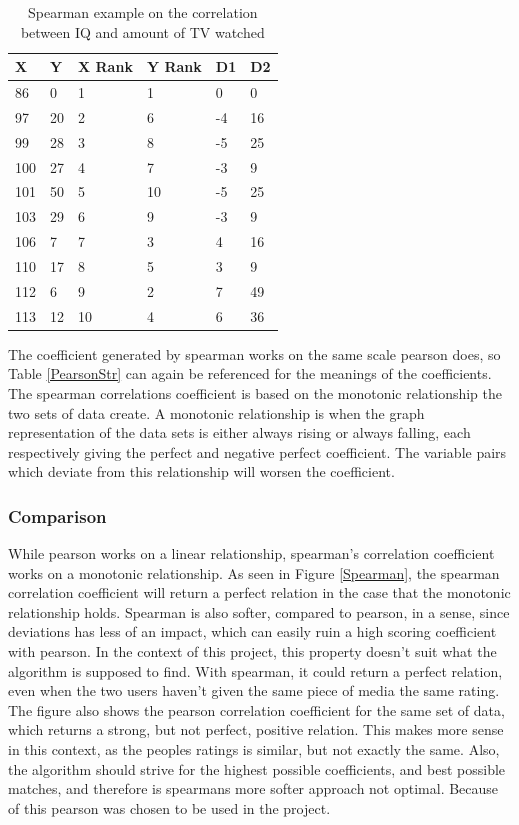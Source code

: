 \begin{table}[htb]
\centering
\begin{tabular}{|l|l|l|l|l|l|} \hline
	\textbf{X} & \textbf{Y} & \textbf{X Rank} & \textbf{Y Rank} & \textbf{D1} & \textbf{D2} \\ \hline
	86 & 0 & 1 & 1 & 0 & 0 \\ \hline
	97 & 20 & 2 & 6 & -4 & 16 \\ \hline
	99 & 28 & 3 & 8 & -5 & 25 \\ \hline
	100 & 27 & 4 & 7 & -3 & 9 \\ \hline
	101 & 50 & 5 & 10 & -5 & 25 \\ \hline
	103 & 29 & 6 & 9 & -3 & 9 \\ \hline
	106 & 7 & 7 & 3 & 4 & 16 \\ \hline
	110 & 17 & 8 & 5 & 3 & 9 \\ \hline
	112 & 6 & 9 & 2 & 7 & 49 \\ \hline
	113 & 12 & 10 & 4 & 6 & 36 \\ \hline
\end{tabular}
\caption{Spearman example on the correlation between IQ and amount of TV watched}
\label{SpearmanEx}
\end{table}

The coefficient generated by spearman works on the same scale pearson does, so Table \ref{PearsonStr} can again be referenced for the meanings of the coefficients. The spearman correlations coefficient is based on the monotonic relationship the two sets of data create. A monotonic relationship is when the graph representation of the data sets is either always rising or always falling, each respectively giving the perfect and negative perfect coefficient. The variable pairs which deviate from this relationship will worsen the coefficient.

\subsubsection{Comparison}

While pearson works on a linear relationship, spearman’s correlation coefficient works on a monotonic relationship. As seen in Figure \ref{Spearman}, the spearman correlation coefficient will return a perfect relation in the case that the monotonic relationship holds. Spearman is also softer, compared to pearson, in a sense, since deviations has less of an impact, which can easily ruin a high scoring coefficient with pearson. In the context of this project, this property doesn’t suit what the algorithm is supposed to find. With spearman, it could return a perfect relation, even when the two users haven’t given the same piece of media the same rating. The figure also shows the pearson correlation coefficient for the same set of data, which returns a strong, but not perfect, positive relation. This makes more sense in this context, as the peoples ratings is similar, but not exactly the same. Also, the algorithm should strive for the highest possible coefficients, and best possible matches, and therefore is spearmans more softer approach not optimal. Because of this pearson was chosen to be used in the project.

